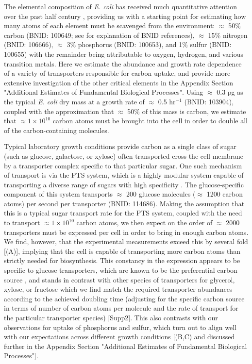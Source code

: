 The elemental composition of \textit{E. coli} has received much quantitative
attention over the past half century \citep{neidhardt1991, taymaz-nikerel2010,
heldal1985, bauer1976}, providing us with a starting point for estimating how
many atoms of each element must be scavenged from the environment: $\approx$
50\% carbon (BNID: 100649; see  for explanation of BNID
references), $\approx$ 15\% nitrogen (BNID: 106666), $\approx$ 3\% phosphorus
(BNID: 100653), and 1\% sulfur (BNID: 100655) with the remainder being
attributable to oxygen, hydrogen, and various transition metals.  Here we
estimate the abundance and growth rate dependence of a variety of transporters
responsible for carbon uptake, and provide more extensive investigation of the
other critical elements in the Appendix
Section "Additional Estimates of Fundamental Biological Processes". Using
$\approx$ 0.3 pg as the typical \textit{E. coli} dry mass at a growth rate of
$\approx$ 0.5 hr$^{-1}$ (BNID: 103904), coupled with the approximation that
$\approx$ 50\% of this mass is carbon, we estimate that $\approx 1\times
10^{10}$ carbon atoms must be brought into the cell in order to double all of
the carbon-containing molecules.

Typical laboratory growth conditions provide carbon as a single class of sugar
(such as glucose, galactose, or xylose) often transported cross the cell
membrane by a transporter complex specific to that particular sugar. One such
mechanism of transport is via the PTS system, which is a highly modular system
capable of transporting a diverse range of sugars with high specificity
\citep{escalante2012}. The glucose-specific component of this system transports
$\approx$ 200 glucose molecules ($\approx$ 1200 carbon atoms) per second per
transporter (BNID: 114686). Making the assumption that this is a typical sugar
transport rate for the PTS system, coupled with the need to transport $\approx 1
\times 10^{10}$ carbon atoms, we then expect on the order of $\approx$ 2000
transporters must be expressed per cell in order to bring in enough carbon atoms.
We find, however, that the experimental
measurements exceed this by several fold [(A)],
implying that the cell is capable of transporting more carbon atoms than
strictly needed for biosynthesis. This constancy in the expression appears to be
specific to glucose transporters, which are known to be the
preferential carbon source \citep{monod1947, liu2005a, aidelberg2014}, and
stands in contrast with other species of transporters for glycerol, xylose, or
fructose which we find match the required transporter abundances according to
the achieved doubling time (adjusting for the specific carbon source in terms of
number of carbon atoms per molecule and the rate of transport for the particular
transporter species) [Supp2]. This also contrasts with our observations for
uptake of phosphorus and sulfur, which turn out to align well with our
expectations across different growth conditions
[(B,C) and discussed further in the Appendix
Section "Additional Estimates of Fundamental Biological Processes"].

